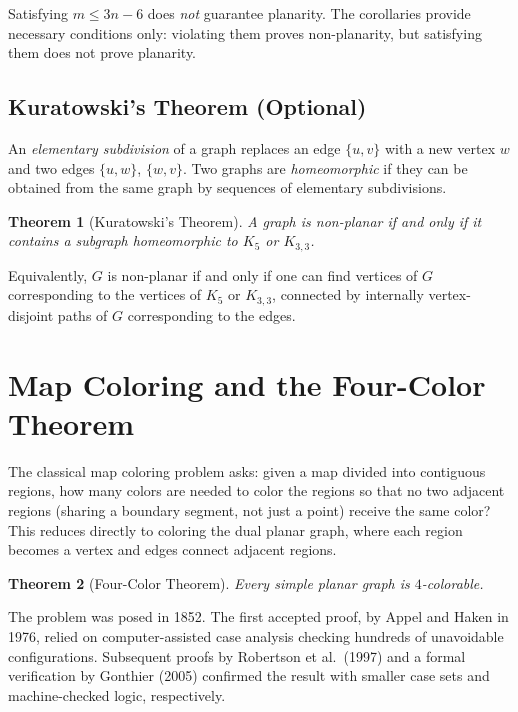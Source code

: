 \documentclass[11pt, a4paper, notitlepage]{report}
\newtheorem{theorem}{Theorem}[section]
\theoremstyle{definition}
\theoremstyle{remark}
\begin{document}
\begin{warning}[title={Warning: Edge Bounds Are Necessary, Not Sufficient}]
Satisfying $m \leq 3n - 6$ does \emph{not} guarantee planarity. The corollaries provide necessary conditions only: violating them proves non-planarity, but satisfying them does not prove planarity.
\end{warning}

\subsection{Kuratowski's Theorem (Optional)}
\label{subsec:kuratowski}

An \emph{elementary subdivision} of a graph replaces an edge $\{u,v\}$ with a new vertex $w$ and two edges $\{u,w\}$, $\{w,v\}$. Two graphs are \emph{homeomorphic} if they can be obtained from the same graph by sequences of elementary subdivisions.

\begin{theorem}[Kuratowski's Theorem]
\label{thm:kuratowski}
A graph is non-planar if and only if it contains a subgraph homeomorphic to $K_5$ or $K_{3,3}$.
\end{theorem}

Equivalently, $G$ is non-planar if and only if one can find vertices of $G$ corresponding to the vertices of $K_5$ or $K_{3,3}$, connected by internally vertex-disjoint paths of $G$ corresponding to the edges.

\section{Map Coloring and the Four-Color Theorem}
\label{sec:four-color}

The classical map coloring problem asks: given a map divided into contiguous regions, how many colors are needed to color the regions so that no two adjacent regions (sharing a boundary segment, not just a point) receive the same color? This reduces directly to coloring the dual planar graph, where each region becomes a vertex and edges connect adjacent regions.

\begin{theorem}[Four-Color Theorem]
\label{thm:four-color}
Every simple planar graph is $4$-colorable.
\end{theorem}

The problem was posed in 1852. The first accepted proof, by Appel and Haken in 1976, relied on computer-assisted case analysis checking hundreds of unavoidable configurations. Subsequent proofs by Robertson et al.\ (1997) and a formal verification by Gonthier (2005) confirmed the result with smaller case sets and machine-checked logic, respectively.
\end{document}
